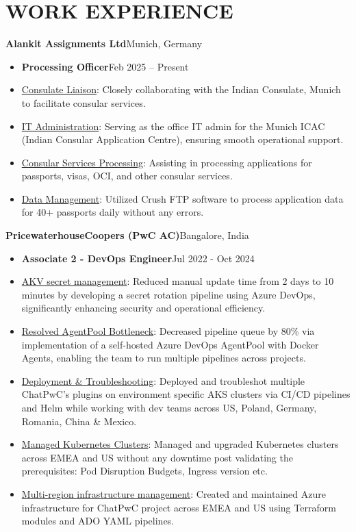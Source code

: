 \documentclass[11pt,a4paper]{article}
\newenvironment{dashlist}{
  \begin{itemize}[label={--}]
}{
  \end{itemize}
}
\begin{document}
\section*{WORK EXPERIENCE}
\noindent\textbf{Alankit Assignments Ltd}\hfill Munich, Germany
\begin{itemize}
\item \textbf{Processing Officer}\hfill Feb 2025 – Present
\end{itemize}
\begin{dashlist}
  \item \uline {Consulate Liaison}: Closely collaborating with the Indian Consulate, Munich to facilitate consular services.
  \item \uline {IT Administration}: Serving as the office IT admin for the Munich ICAC (Indian Consular Application Centre), ensuring smooth operational support.
  \item \uline {Consular Services Processing}: Assisting in processing applications for passports, visas, OCI, and other consular services.
  \item \uline {Data Management}: Utilized Crush FTP software to process application data for 40+ passports daily without any errors.
\end{dashlist}

\noindent\textbf{PricewaterhouseCoopers (PwC AC)}\hfill Bangalore, India
\begin{itemize}
\item \textbf{Associate 2 - DevOps Engineer}\hfill Jul 2022 - Oct 2024
\end{itemize}
\begin{dashlist}
    \item \uline {AKV secret management}: Reduced manual update time from 2 days to 10 minutes by developing a secret rotation pipeline using Azure DevOps, significantly enhancing security and operational efficiency.
    \item \uline {Resolved AgentPool Bottleneck}: Decreased pipeline queue by 80\% via implementation of a self-hosted Azure DevOps AgentPool with Docker Agents, enabling the team to run multiple pipelines across projects.
    \item \uline {Deployment \& Troubleshooting}: Deployed and troubleshot multiple ChatPwC's plugins on environment specific AKS clusters via CI/CD pipelines and Helm while working with dev teams across US, Poland, Germany, Romania, China \& Mexico.
    \item \uline {Managed Kubernetes Clusters}: Managed and upgraded Kubernetes clusters across EMEA and US without any downtime post validating the prerequisites: Pod Disruption Budgets, Ingress version etc.
    \item \uline {Multi-region infrastructure management}: Created and maintained Azure infrastructure for ChatPwC project across EMEA and US using Terraform modules and ADO YAML pipelines.
\end{dashlist}
\end{document}
